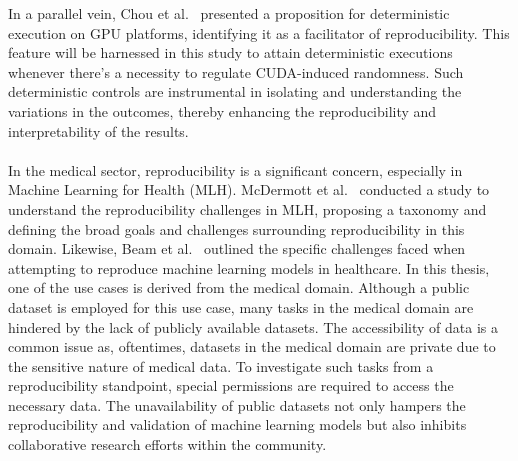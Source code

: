 In a parallel vein, Chou et al.~\cite{chou2020deterministic} presented a proposition for deterministic execution on GPU platforms, identifying it as a facilitator of reproducibility. This feature will be harnessed in this study to attain deterministic executions whenever there's a necessity to regulate CUDA-induced randomness. Such deterministic controls are instrumental in isolating and understanding the variations in the outcomes, thereby enhancing the reproducibility and interpretability of the results.
\\
\\
In the medical sector, reproducibility is a significant concern, especially in Machine Learning for Health (MLH). McDermott et al.~\cite{mcdermott2021reproducibility} conducted a study to understand the reproducibility challenges in MLH, proposing a taxonomy and defining the broad goals and challenges surrounding reproducibility in this domain. Likewise, Beam et al.~\cite{beam2020challenges} outlined the specific challenges faced when attempting to reproduce machine learning models in healthcare.
In this thesis, one of the use cases is derived from the medical domain. Although a public dataset is employed for this use case, many tasks in the medical domain are hindered by the lack of publicly available datasets. The accessibility of data is a common issue as, oftentimes, datasets in the medical domain are private due to the sensitive nature of medical data. To investigate such tasks from a reproducibility standpoint, special permissions are required to access the necessary data.
The unavailability of public datasets not only hampers the reproducibility and validation of machine learning models but also inhibits collaborative research efforts within the community.



